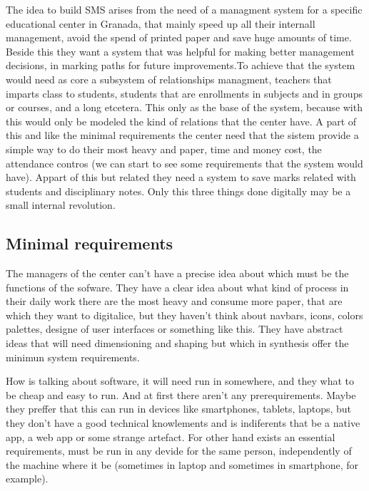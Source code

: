 \documentclass[oneside,english,titlepage]{scrbook}
\begin{document}
The idea to build SMS arises from the need of a managment system for
a specific educational center in Granada, that mainly speed up all
their internall management, avoid the spend of printed paper and save
huge amounts of time. Beside this they want a system that was helpful
for making better management decisions, in marking paths for future
improvements.\bigskip To achieve that the system would need as core
a subsystem of relationships managment, teachers that imparts class
to students, students that are enrollments in subjects and in groups
or courses, and a long etcetera. This only as the base of the system,
because with this would only be modeled the kind of relations that
the center have. A part of this and like the minimal requirements
the center need that the sistem provide a simple way to do their most
heavy and paper, time and money cost, the attendance contros (we can
start to see some requirements that the system would have). Appart
of this but related they need a system to save marks related with
students and disciplinary notes. Only this three things done digitally
may be a small internal revolution.

\subsection{Minimal requirements}

The managers of the center can't have a precise idea about which must be the functions of the sofware. They have a clear idea about what kind of process in their daily work there are the most heavy and consume more paper, that are which they want to digitalice, but they haven't think about navbars, icons, colors palettes, designe of user interfaces or something like this.  They have abstract ideas that will need dimensioning and shaping but which in synthesis offer the minimun system requirements.

\bigskip
{}
\bigskip

How is talking about software, it will need run in somewhere, and they what to be cheap and easy to run. And at first there aren't any prerequirements. Maybe they preffer that this can run in devices like smartphones, tablets, laptops, but they don't have a good technical knowlements and is indiferents that be a native app, a web app or some strange artefact.
For other hand exists an essential requirements, must be run in any devide for the same person, independently of the machine where it be (sometimes in laptop and sometimes in smartphone, for example).
\end{document}
